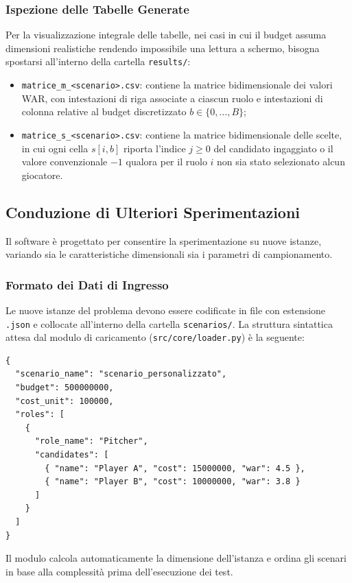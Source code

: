 \subsubsection{Ispezione delle Tabelle Generate}
Per la visualizzazione integrale delle tabelle, nei casi in cui il budget assuma dimensioni realistiche rendendo impossibile una lettura a schermo, bisogna spostarsi all'interno della cartella \texttt{results/}:
\begin{itemize}
	\item \texttt{matrice\_m\_<scenario>.csv}: contiene la matrice bidimensionale dei valori WAR, con intestazioni di riga associate a ciascun ruolo e intestazioni di colonna relative al budget discretizzato $b \in \{0, \dots, B\}$;
	\item \texttt{matrice\_s\_<scenario>.csv}: contiene la matrice bidimensionale delle scelte, in cui ogni cella $s[i, b]$ riporta l'indice $j \ge 0$ del candidato ingaggiato o il valore convenzionale $-1$ qualora per il ruolo $i$ non sia stato selezionato alcun giocatore.
\end{itemize}

\subsection{Conduzione di Ulteriori Sperimentazioni}
Il software è progettato per consentire la sperimentazione su nuove istanze, variando sia le caratteristiche dimensionali sia i parametri di campionamento.

\subsubsection{Formato dei Dati di Ingresso}
Le nuove istanze del problema devono essere codificate in file con estensione \texttt{.json} e collocate all'interno della cartella \texttt{scenarios/}. La struttura sintattica attesa dal modulo di caricamento (\texttt{src/core/loader.py}) è la seguente:
\begin{verbatim}
{
  "scenario_name": "scenario_personalizzato",
  "budget": 500000000,
  "cost_unit": 100000,
  "roles": [
    {
      "role_name": "Pitcher",
      "candidates": [
        { "name": "Player A", "cost": 15000000, "war": 4.5 },
        { "name": "Player B", "cost": 10000000, "war": 3.8 }
      ]
    }
  ]
}
\end{verbatim}
Il modulo calcola automaticamente la dimensione dell'istanza e ordina gli scenari in base alla complessità prima dell'esecuzione dei test.

